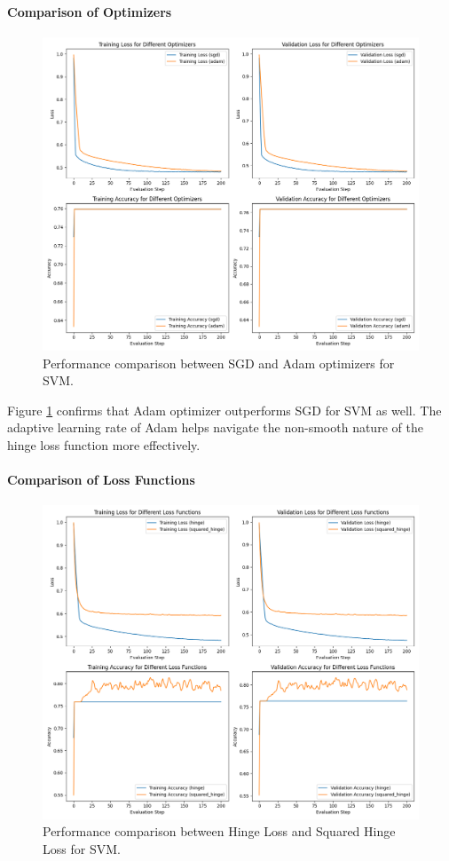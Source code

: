 \documentclass[journal, a4paper]{IEEEtran}
\begin{document}
\paragraph{Comparison of Optimizers}
\begin{figure}[htbp]
\centering
\includegraphics[width=\linewidth]{svm_optimizers.png}
\caption{Performance comparison between SGD and Adam optimizers for SVM.}
\label{fig:svm_opt}
\end{figure}

Figure \ref{fig:svm_opt} confirms that Adam optimizer outperforms SGD for SVM as well. The adaptive learning rate of Adam helps navigate the non-smooth nature of the hinge loss function more effectively.

\paragraph{Comparison of Loss Functions}
\begin{figure}[htbp]
\centering
\includegraphics[width=\linewidth]{svm_loss_functions.png}
\caption{Performance comparison between Hinge Loss and Squared Hinge Loss for SVM.}
\label{fig:svm_loss}
\end{figure}
\end{document}
